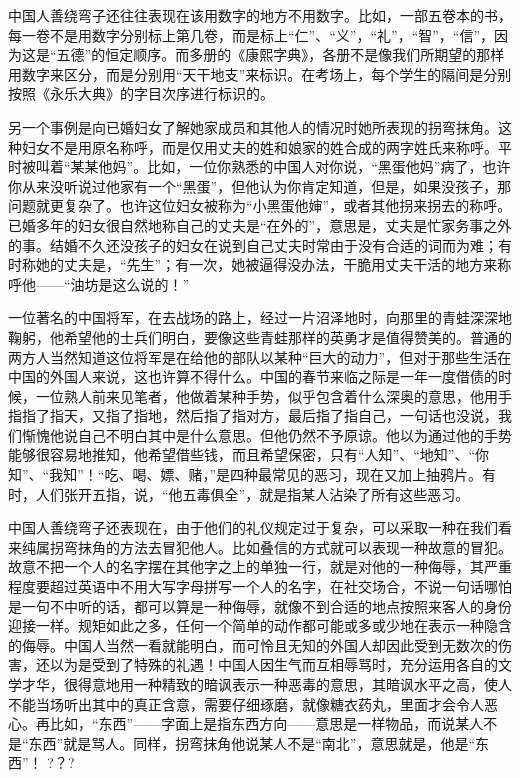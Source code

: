 \documentclass[12pt,oneside]{book}
\begin{document}
\begin{common-format}
中国人善绕弯子还往往表现在该用数字的地方不用数字。比如，一部五卷本的书，每一卷不是用数字分别标上第几卷，而是标上“仁”、“义”，“礼”，“智”，“信”，因为这是“五德”的恒定顺序。而多册的《康熙字典》，各册不是像我们所期望的那样用数字来区分，而是分别用“天干地支”来标识。在考场上，每个学生的隔间是分别按照《永乐大典》的字目次序进行标识的。 

另一个事例是向已婚妇女了解她家成员和其他人的情况时她所表现的拐弯抹角。这种妇女不是用原名称呼，而是仅用丈夫的姓和娘家的姓合成的两字姓氏来称呼。平时被叫着“某某他妈”。比如，一位你熟悉的中国人对你说，“黑蛋他妈”病了，也许你从来没听说过他家有一个“黑蛋”，但他认为你肯定知道，但是，如果没孩子，那问题就更复杂了。也许这位妇女被称为“小黑蛋他婶”，或者其他拐来拐去的称呼。已婚多年的妇女很自然地称自己的丈夫是“在外的”，意思是，丈夫是忙家务事之外的事。结婚不久还没孩子的妇女在说到自己丈夫时常由于没有合适的词而为难；有时称她的丈夫是，“先生”；有一次，她被逼得没办法，干脆用丈夫干活的地方来称呼他——“油坊是这么说的！” 

一位著名的中国将军，在去战场的路上，经过一片沼泽地时，向那里的青蛙深深地鞠躬，他希望他的士兵们明白，要像这些青蛙那样的英勇才是值得赞美的。普通的两方人当然知道这位将军是在给他的部队以某种“巨大的动力”，但对于那些生活在中国的外国人来说，这也许算不得什么。中国的春节来临之际是一年一度借债的时候，一位熟人前来见笔者，他做着某种手势，似乎包含着什么深奥的意思，他用手指指了指天，又指了指地，然后指了指对方，最后指了指自己，一句话也没说，我们惭愧他说自己不明白其中是什么意思。但他仍然不予原谅。他以为通过他的手势能够很容易地推知，他希望借些钱，而且希望保密，只有“人知”、“地知”、“你知”、“我知”！“吃、喝、嫖、赌，”是四种最常见的恶习，现在又加上抽鸦片。有时，人们张开五指，说，“他五毒俱全”，就是指某人沾染了所有这些恶习。 

中国人善绕弯子还表现在，由于他们的礼仪规定过于复杂，可以采取一种在我们看来纯属拐弯抹角的方法去冒犯他人。比如叠信的方式就可以表现一种故意的冒犯。故意不把一个人的名字摆在其他字之上的单独一行，就是对他的一种侮辱，其严重程度要超过英语中不用大写字母拼写一个人的名字，在社交场合，不说一句话哪怕是一句不中听的话，都可以算是一种侮辱，就像不到合适的地点按照来客人的身份迎接一样。规矩如此之多，任何一个简单的动作都可能或多或少地在表示一种隐含的侮辱。中国人当然一看就能明白，而可怜且无知的外国人却因此受到无数次的伤害，还以为是受到了特殊的礼遇！中国人因生气而互相辱骂时，充分运用各自的文学才华，很得意地用一种精致的暗讽表示一种恶毒的意思，其暗讽水平之高，使人不能当场听出其中的真正含意，需要仔细琢磨，就像糖衣药丸，里面才会令人恶心。再比如，“东西”——字面上是指东西方向——意思是一样物品，而说某人不是“东西”就是骂人。同样，拐弯抹角他说某人不是“南北”，意思就是，他是“东西”！ ?？?


\end{common-format}
\end{document}
